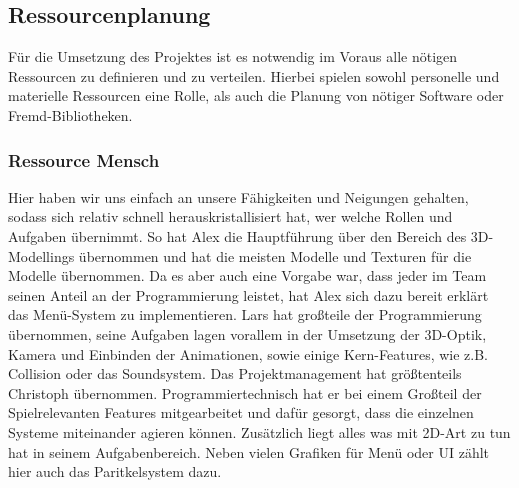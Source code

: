 \documentclass[12pt]{article}
\begin{document}
\vspace{2cm}
\subsection{Ressourcenplanung}
Für die Umsetzung des Projektes ist es notwendig im Voraus alle nötigen Ressourcen zu definieren und zu verteilen. Hierbei spielen sowohl personelle und materielle Ressourcen eine Rolle, als auch die Planung von nötiger Software oder Fremd-Bibliotheken. \newline
\subsubsection{Ressource Mensch}
Hier haben wir uns einfach an unsere Fähigkeiten und Neigungen gehalten, sodass sich relativ schnell herauskristallisiert hat, wer welche Rollen und Aufgaben übernimmt. So hat Alex die Hauptführung über den Bereich des 3D-Modellings übernommen und hat die meisten Modelle und Texturen für die Modelle übernommen.
Da es aber auch eine Vorgabe war, dass jeder im Team seinen Anteil an der Programmierung leistet, hat Alex sich dazu bereit erklärt das Menü-System zu implementieren. \newline
Lars hat großteile der Programmierung übernommen, seine Aufgaben lagen vorallem in der Umsetzung der 3D-Optik, Kamera und Einbinden der Animationen, sowie einige Kern-Features, wie z.B. Collision oder das Soundsystem. \newline
Das Projektmanagement hat größtenteils Christoph übernommen. Programmiertechnisch hat er bei einem Großteil der Spielrelevanten Features mitgearbeitet und dafür gesorgt, dass die einzelnen Systeme miteinander agieren können. Zusätzlich liegt alles was mit 2D-Art zu tun hat in seinem Aufgabenbereich. Neben vielen Grafiken für Menü oder UI zählt hier auch das Paritkelsystem dazu.
\end{document}
